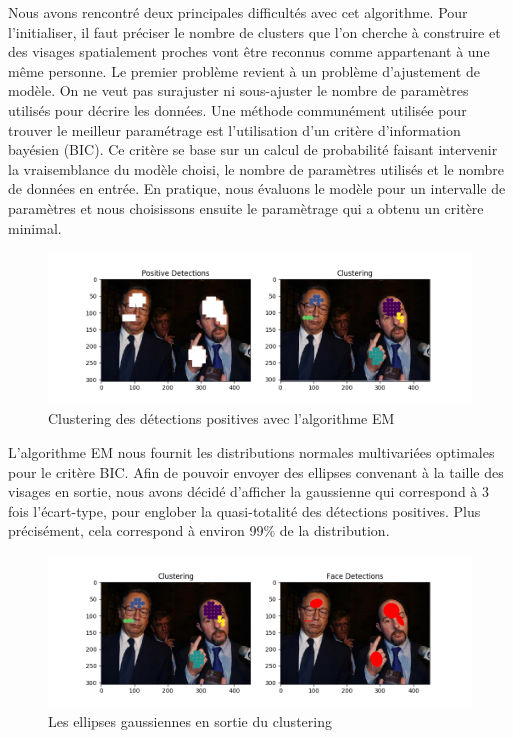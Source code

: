 \documentclass[a4paper,11pt]{article}
\begin{document}
Nous avons rencontré deux principales difficultés avec cet algorithme. 
Pour l'initialiser, il faut préciser le nombre de clusters que l'on cherche à construire et des visages spatialement proches vont être reconnus comme appartenant à une même personne.
Le premier problème revient à un problème d'ajustement de modèle. On ne veut pas surajuster ni sous-ajuster le nombre de paramètres utilisés pour décrire les données.
Une méthode communément utilisée pour trouver le meilleur paramétrage est l'utilisation d'un critère d'information bayésien (BIC).
Ce critère se base sur un calcul de probabilité faisant intervenir la vraisemblance du modèle choisi, le nombre de paramètres utilisés et le nombre de données en entrée.
En pratique, nous évaluons le modèle pour un intervalle de paramètres et nous choisissons ensuite le paramètrage qui a obtenu un critère minimal.
\begin{figure}[H]
\begin{center}
    \includegraphics[scale=0.4]{clustering_presentation_1.png}
    \caption{Clustering des détections positives avec l'algorithme EM} 
\end{center}
\end{figure}
L'algorithme EM nous fournit les distributions normales multivariées optimales pour le critère BIC.
Afin de pouvoir envoyer des ellipses convenant à la taille des visages en sortie, nous avons décidé d'afficher la gaussienne qui correspond à 3 fois l'écart-type, pour englober la quasi-totalité des détections positives.
Plus précisément, cela correspond à environ 99\% de la distribution.
\begin{figure}[H]
\centering
    \includegraphics[scale=0.4]{clustering_presentation_2.png}
    \caption{Les ellipses gaussiennes en sortie du clustering} 
\end{figure}
\end{document}
